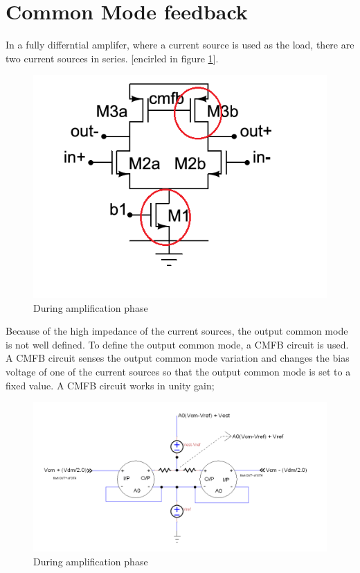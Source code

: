 \documentclass{article}
\begin{document}
\section{Common Mode feedback}

In a fully differntial amplifer, where a current source is used as the load, there are two current sources in series. [encirled in figure \ref{fig:simple_ota1}].
\begin{figure}[h]
  \includegraphics{simple_ota_cmfb.png}
  \caption{During amplification phase}
  \label{fig:simple_ota1}
\end{figure}
 Because of the high impedance of the current sources, the output common mode is not well defined. To define the output common mode, a CMFB circuit is used. A CMFB circuit senses the output common mode variation and changes the bias voltage of one of the current sources so that the output common mode is set to a fixed value. A CMFB circuit works in unity gain; \\
\begin{figure}[h!]
  \includegraphics[width=\linewidth]{cmfb.png}
  \caption{During amplification phase}
  \label{fig:cmfb}
\end{figure}
\end{document}

